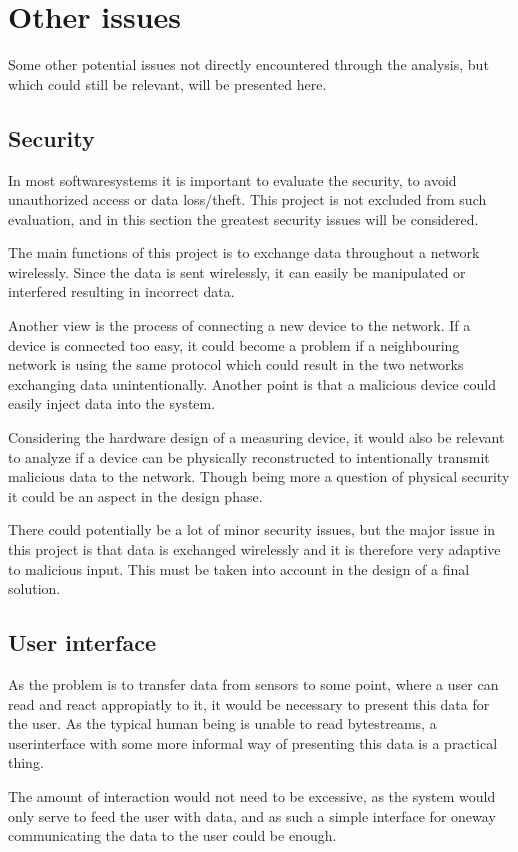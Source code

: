 \section{Other issues}
Some other potential issues not directly encountered through the analysis, but which could still be relevant, will be presented here.

\subsection{Security}
In most softwaresystems it is important to evaluate the security, to avoid unauthorized access or data loss/theft. This project is not excluded from such evaluation, and in this section the greatest security issues will be considered.

The main functions of this project is to exchange data throughout a network wirelessly. Since the data is sent wirelessly, it can easily be manipulated or interfered resulting in incorrect data.

Another view is the process of connecting a new device to the network. If a device is connected too easy, it could become a problem if a neighbouring network is using the same protocol which could result in the two networks exchanging data unintentionally. Another point is that a malicious device could easily inject data into the system.

Considering the hardware design of a measuring device, it would also be relevant to analyze if a device can be physically reconstructed to intentionally transmit malicious data to the network. Though being more a question of physical security it could be an aspect in the design phase.

There could potentially be a lot of minor security issues, but the major issue in this project is that data is exchanged wirelessly and it is therefore very adaptive to malicious input. This must be taken into account in the design of a final solution.

\subsection{User interface}
As the problem is to transfer data from sensors to some point, where a user can read and react appropiatly to it, it would be necessary to present this data for the user. As the typical human being is unable to read bytestreams, a userinterface with some more informal way of presenting this data is a practical thing.

The amount of interaction would not need to be excessive, as the system would only serve to feed the user with data, and as such a simple interface for oneway communicating the data to the user could be enough.
